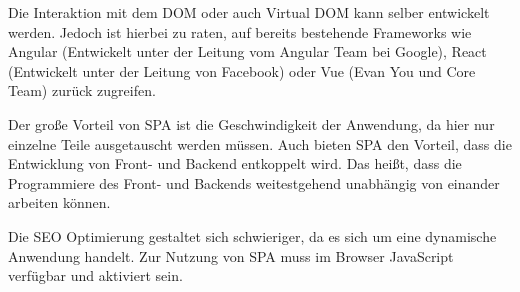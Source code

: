 Die Interaktion mit dem DOM oder auch Virtual DOM kann selber entwickelt werden. Jedoch ist hierbei zu raten, auf bereits bestehende Frameworks wie Angular (Entwickelt unter der Leitung vom Angular Team bei Google), React (Entwickelt unter der Leitung von Facebook) oder Vue (Evan You und Core Team) zurück zugreifen. 

Der große Vorteil von SPA ist die Geschwindigkeit der Anwendung, da hier nur einzelne Teile ausgetauscht werden müssen. Auch bieten SPA den Vorteil, dass die Entwicklung von Front- und Backend entkoppelt wird. Das heißt, dass die Programmiere des Front- und Backends weitestgehend unabhängig von einander arbeiten können.

Die SEO Optimierung gestaltet sich schwieriger, da es sich um eine dynamische Anwendung handelt.
Zur Nutzung von SPA muss im Browser JavaScript verfügbar und aktiviert sein.


